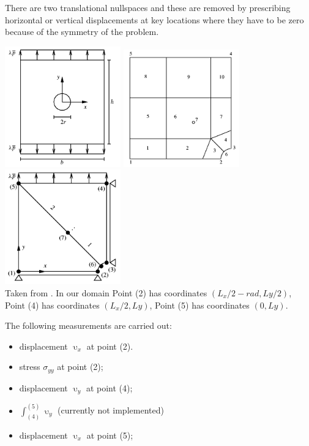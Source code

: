 There are two translational nullspaces and these are removed by 
prescribing horizontal or vertical displacements at key locations
where they have to be zero because of the symmetry of the problem.

\begin{center}
\includegraphics[width=5cm]{python_codes/fieldstone_124/images/rarr03a}
\includegraphics[width=5cm]{python_codes/fieldstone_124/images/rarr03c}
\includegraphics[width=5cm]{python_codes/fieldstone_124/images/rarr03f}\\
{\captionfont Taken from \textcite{rarr03}. In our domain 
Point (2) has coordinates $(L_x/2-rad,Ly/2)$,
Point (4) has coordinates $(L_x/2,Ly)$,
Point (5) has coordinates $(0,Ly)$.}
\end{center}

The following measurements are carried out:
\begin{itemize}
\item displacement $\upupsilon_x$ at point (2).
\item stress $\sigma_{yy}$  at point (2);
\item displacement $\upupsilon_y$ at point (4);
\item $\int_{(4)}^{(5)} \upupsilon_y$ (currently not implemented) 
\item displacement $\upupsilon_x$ at point (5);
\end{itemize}

